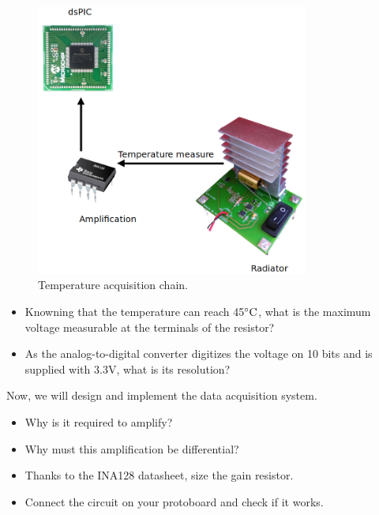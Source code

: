 \documentclass[11pt,a4paper]{article}
\theoremstyle{definition}%
\begin{document}
\begin{figure}[H]
\center
\includegraphics[width=0.8\textwidth]{acquisition}
\caption{Temperature acquisition chain.}
\label{fig:acquisition}
\end{figure}

\begin{itemize}
	\item Knowning that the temperature can reach 45$\celsius$, what is the maximum voltage measurable at the terminals of the resistor?
	\item As the analog-to-digital converter digitizes the voltage on 10 bits and is supplied with 3.3V, what is its resolution?
\end{itemize}

Now, we will design and implement the data acquisition system.
\begin{itemize}
	\item Why is it required to amplify?
	\item Why must this amplification be differential?
	\item Thanks to the INA128 datasheet, size the gain resistor.
	\item Connect the circuit on your protoboard and check if it works.
\end{itemize}
\end{document}
